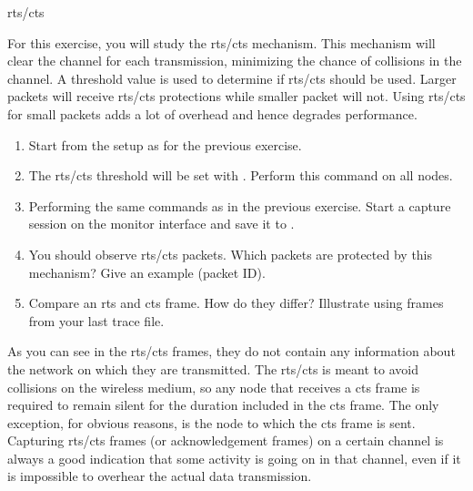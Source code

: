 \begin{exercise}{\ac{rts}/\ac{cts}}

For this exercise, you will study the \ac{rts}/\ac{cts} mechanism. This mechanism will clear the channel for each transmission, minimizing the chance of collisions in the channel. A threshold value is used to determine if \ac{rts}/\ac{cts} should be used. Larger packets will receive \ac{rts}/\ac{cts} protections while smaller packet will not. Using \ac{rts}/\ac{cts} for small packets adds a lot of overhead and hence degrades performance.

\begin{enumerate}
	\item Start from the setup as for the previous exercise.
	\item The \ac{rts}/\ac{cts} threshold will be set with . Perform this command on all nodes.
	\item Performing the same  commands as in the previous exercise. Start a capture session on the monitor interface and save it to .
	\item You should observe \ac{rts}/\ac{cts} packets. Which packets are protected by this mechanism? Give an example (packet ID).\newline
	\begin{esolution}
	\end{esolution}
	\item Compare an \ac{rts} and \ac{cts} frame. How do they differ? Illustrate using frames from your last trace file.
	\begin{esolution}
	\end{esolution}
\end{enumerate}

As you can see in the \ac{rts}/\ac{cts} frames, they do not contain any information about the network on which they are transmitted. The \ac{rts}/\ac{cts} is meant to avoid collisions on the wireless medium, so any node that receives a \ac{cts} frame is required to remain silent for the duration included in the \ac{cts} frame. The only exception, for obvious reasons, is the node to which the \ac{cts} frame is sent. Capturing \ac{rts}/\ac{cts} frames (or acknowledgement frames) on a certain channel is always a good indication that some activity is going on in that channel, even if it is impossible to overhear the actual data transmission.
\end{exercise}

\section{}



